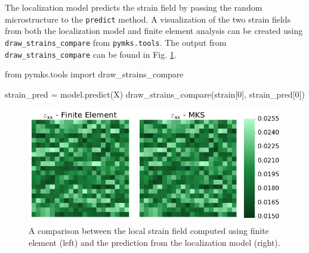 \documentclass{bmcart}
\newcommand{\fimage}
{\fcolorbox{outcolor}{white}}
{}
\begin{document}
    The localization model predicts the strain field by passing the
random microstructure to the \texttt{predict} method. A visualization
of the two strain fields from both the localization model and finite element
analysis can be created using \texttt{draw\_strains\_compare} from
\texttt{pymks.tools}. The output from \texttt{draw\_strains\_compare}
can be found in Fig. \ref{fig:drawStrainCompare}.

\begin{_input}
from pymks.tools import draw_strains_compare

strain_pred = model.predict(X)
draw_strains_compare(strain[0], strain_pred[0])

\end{_input}

\begin{figure}
    \centering
    \includegraphics[scale=.535]{pymks_paper_localization_files/pymks_paper_localization_14_0.png}
    \caption{A comparison between the local strain field computed using finite element (left) and
    the prediction from the localization model (right).}
    \label{fig:drawStrainCompare}
\end{figure}



    
\end{document}
